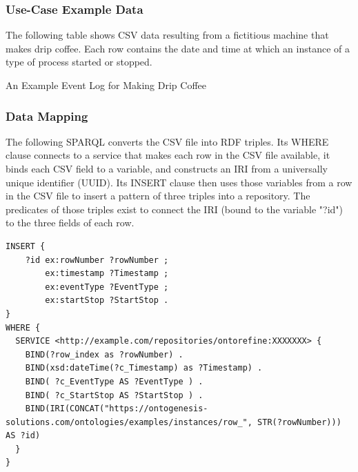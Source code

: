 

\subsubsection*{Use-Case Example Data}
The following table shows CSV data resulting from a fictitious machine that makes drip coffee. Each row contains the date and time at which an instance of a type of process started or stopped.

\begin{table}[ht]
    \centering
    \caption{An Example Event Log for Making Drip Coffee}
    \label{tab:DripCoffee}
\end{table}    

\subsubsection*{Data Mapping}
The following SPARQL converts the CSV file into RDF triples. Its WHERE clause connects to a service that makes each row in the CSV file available, it binds each CSV field to a variable, and constructs an IRI from a universally unique identifier (UUID). Its INSERT clause then uses those variables from a row in the CSV file to insert a pattern of three triples into a repository. The predicates of those triples exist to connect the IRI (bound to the variable "?id") to the three fields of each row.

% 

\begin{verbatim}
INSERT {
    ?id ex:rowNumber ?rowNumber ;
        ex:timestamp ?Timestamp ;
        ex:eventType ?EventType ;
        ex:startStop ?StartStop .
}
WHERE {
  SERVICE <http://example.com/repositories/ontorefine:XXXXXXX> {
    BIND(?row_index as ?rowNumber) .
    BIND(xsd:dateTime(?c_Timestamp) as ?Timestamp) .
    BIND( ?c_EventType AS ?EventType ) .
    BIND( ?c_StartStop AS ?StartStop ) .
    BIND(IRI(CONCAT("https://ontogenesis-solutions.com/ontologies/examples/instances/row_", STR(?rowNumber))) AS ?id)
  }
}
\end{verbatim}

